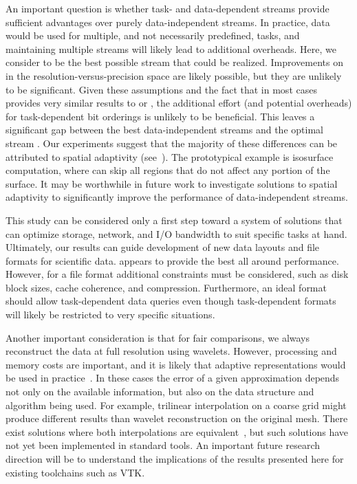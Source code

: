 An important question is whether task- and data-dependent streams provide sufficient advantages over
purely data-independent streams. In practice, data would be used for multiple, and not necessarily
predefined, tasks, and maintaining multiple streams will likely lead to additional overheads. Here,
we consider \ssig to be the best possible stream that could be realized. Improvements on \ssig in
the resolution-versus-precision space are likely possible, but they are unlikely to be significant.
Given these assumptions and the fact that \ssig in most cases provides very similar results to \sbit
or \swav, the additional effort (and potential overheads) for task-dependent bit orderings is
unlikely to be beneficial. This leaves a significant gap between the best data-independent streams
and the optimal stream \sopt. Our experiments suggest that the majority of these differences can be
attributed to spatial adaptivity (see~). The prototypical example is
isosurface computation, where \sopt can skip all regions that do not affect any portion of the
surface. It may be worthwhile in future work to investigate solutions to spatial adaptivity to
significantly improve the performance of data-independent streams.

This study can be considered only a first step toward a system of solutions that can optimize
storage, network, and I/O bandwidth to suit specific tasks at hand. Ultimately, our results can
guide development of new data layouts and file formats for scientific data. \swav appears to provide
the best all around performance. However, for a file format additional constraints must be
considered, such as disk block sizes, cache coherence, and compression. Furthermore, an ideal format
should allow task-dependent data queries even though task-dependent formats will likely be
restricted to very specific situations. 

Another important consideration is that for fair comparisons, we always reconstruct the data at full
resolution using wavelets. However, processing and memory costs are important, and it is likely that
adaptive representations would be used in practice~\cite{gigavoxels,Gobbetti2008,vdb2013}. In these
cases the error of a given approximation depends not only on the available information, but also on
the data structure and algorithm being used. For example, trilinear interpolation on a coarse grid
might produce different results than wavelet reconstruction on the original mesh. There exist
solutions where both interpolations are equivalent~\cite{weiss}, but such solutions have not yet
been implemented in standard tools. An important future research direction will be to understand the
implications of the results presented here for existing toolchains such as VTK.

